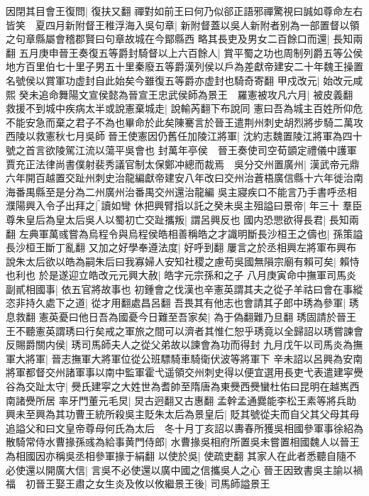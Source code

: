 因閉其目會王復問|{
	復扶又翻}
禪對如前王曰何乃似郤正語邪禪驚視曰誠如尊命左右皆笑　夏四月新附督王稚浮海入吳句章|{
	新附督蓋以吳人新附者别為一部置督以領之句章縣屬會稽郡賢曰句章故城在今鄮縣西}
略其長吏及男女二百餘口而還|{
	長知兩翻}
五月庚申晉王奏復五等爵封騎督以上六百餘人|{
	賞平蜀之功也周制列爵五等公侯地方百里伯七十里子男五十里秦廢五等爵漢列侯以戶為差獻帝建安二十年魏王操置名號侯以賞軍功虚封自此始矣今雖復五等爵亦虚封也騎奇寄翻}
甲戍改元|{
	始改元咸熙}
癸未追命舞陽文宣侯懿為晉宣王忠武侯師為景王　羅憲被攻凡六月|{
	被皮義翻}
救援不到城中疾病太半或說憲棄城走|{
	說輸芮翻下布說同}
憲曰吾為城主百姓所仰危不能安急而棄之君子不為也畢命於此矣陳騫言於晉王遣荆州刺史胡烈將步騎二萬攻西陵以救憲秋七月吳師晉王使憲因仍舊任加陵江將軍|{
	沈約志魏置陵江將軍為四十號之首言欲陵駕江流以蕩平吳會也}
封萬年亭侯　晉王奏使司空荀顗定禮儀中護軍賈充正法律尚書僕射裴秀議官制太保鄭冲總而裁焉　吳分交州置廣州|{
	漢武帝元鼎六年開百越置交趾州刺史治龍編獻帝建安八年改曰交州治蒼梧廣信縣十六年徙治南海番禺縣至是分為二州廣州治番禺交州還治龍編}
吳主寢疾口不能言乃手書呼丞相濮陽興入令子出拜之|{
	讀如彎}
休把興臂指以託之癸未吳主殂謚曰景帝|{
	年三十}
羣臣尊朱皇后為皇太后吳人以蜀初亡交趾攜叛|{
	謂呂興反也}
國内恐愳欲得長君|{
	長知兩翻}
左典軍萬彧嘗為烏程令與烏程侯皓相善稱皓之才識明斷長沙桓王之儔也|{
	孫策謚長沙桓王斷丁亂翻}
又加之好學奉遵法度|{
	好呼到翻}
屢言之於丞相興左將軍布興布說朱太后欲以皓為嗣朱后曰我寡婦人安知社稷之慮苟吳國無隕宗廟有賴可矣|{
	賴恃也利也}
於是遂迎立皓改元元興大赦|{
	皓字元宗孫和之子}
八月庚寅命中撫軍司馬炎副貳相國事|{
	依五官將故事也}
初鍾會之伐漢也辛憲英謂其夫之從子羊祜曰會在事縱恣非持久處下之道|{
	從才用翻處昌呂翻}
吾畏其有他志也會請其子郎中琇為參軍|{
	琇息救翻}
憲英憂曰他日吾為國憂今日難至吾家矣|{
	為于偽翻難乃旦翻}
琇固請於晉王王不聽憲英謂琇曰行矣戒之軍旅之間可以濟者其惟仁恕乎琇竟以全歸詔以琇嘗諫會反賜爵關内侯|{
	琇司馬師夫人之從父弟故以諫會為功而得封}
九月戊午以司馬炎為撫軍大將軍|{
	晉志撫軍大將軍位從公班驃騎車騎衛伏波等將軍下}
辛未詔以呂興為安南將軍都督交州諸軍事以南中監軍霍弋遥領交州刺史得以便宜選用長吏弋表遣建寜㸑谷為交趾太守|{
	㸑氏建寜之大姓世為耆帥至隋唐為東㸑西㸑蠻杜佑曰昆明在越嶲西南諸㸑所居}
率牙門董元毛炅|{
	炅古迥翻又古惠翻}
孟幹孟通爨能李松王素等將兵助興未至興為其功曹王統所殺吳主貶朱太后為景皇后|{
	貶其號從夫而自父其父母其母}
追謚父和曰文皇帝尊母何氏為太后　冬十月丁亥詔以夀春所獲吳相國參軍事徐紹為散騎常侍水曹掾孫彧為給事黄門侍郎|{
	水曹掾吳相府所置吳未嘗置相國魏人以晉王為相國因亦稱吳丞相參軍掾于絹翻}
以使於吳|{
	使疏吏翻}
其家人在此者悉聽自隨不必使還以開廣大信|{
	言吳不必使還以廣中國之信攜吳人之心}
晉王因致書吳主諭以禍福　初晉王娶王肅之女生炎及攸以攸繼景王後|{
	司馬師謚景王}
